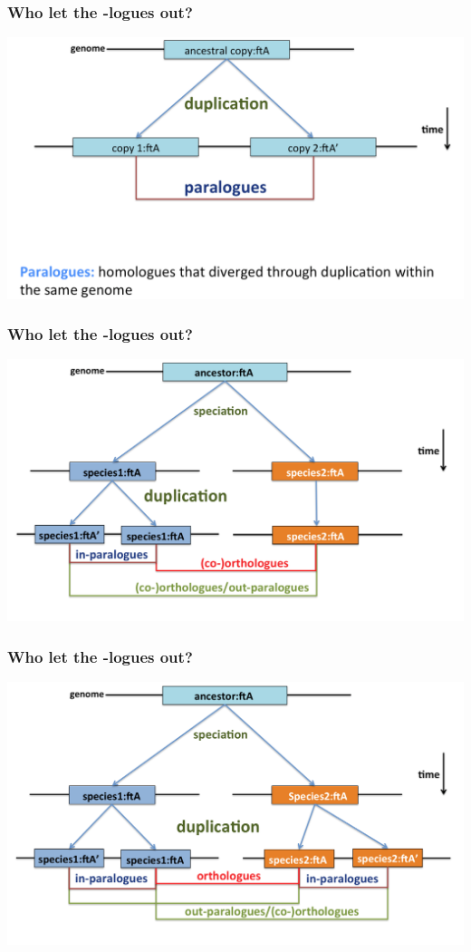 % 
\begin{frame}
  \frametitle{Who let the -logues out?}
  \begin{center}
    \includegraphics[width=1\textwidth]{images/logues3}  
  \end{center}  
\end{frame}

% 
\begin{frame}
  \frametitle{Who let the -logues out?}
  \begin{center}
    \includegraphics[width=1\textwidth]{images/logues4}  
  \end{center}  
\end{frame}

% 
\begin{frame}
  \frametitle{Who let the -logues out?}
  \begin{center}
    \includegraphics[width=1\textwidth]{images/logues5}  
  \end{center}  
\end{frame}

